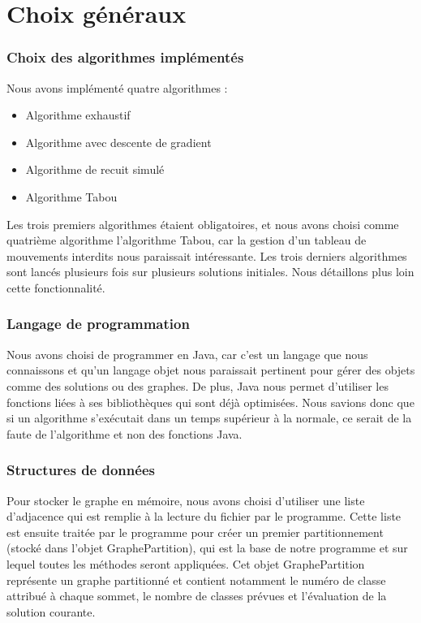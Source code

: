 \documentclass[12pt]{article}
\begin{document}
\newpage	
	
\part{Choix généraux}

\section{Choix des algorithmes implémentés}
Nous avons implémenté quatre algorithmes :
	\begin{itemize}
    \item Algorithme exhaustif
    \item Algorithme avec descente de gradient
	\item Algorithme de recuit simulé
	\item Algorithme Tabou
	\end{itemize}
Les trois premiers algorithmes étaient obligatoires, et nous avons choisi comme quatrième algorithme l’algorithme Tabou, car la gestion d’un tableau de mouvements interdits nous paraissait intéressante.
Les trois derniers algorithmes sont lancés plusieurs fois sur plusieurs solutions initiales. Nous détaillons plus loin cette fonctionnalité.

\section{Langage de programmation}
    Nous avons choisi de programmer en Java, car c’est un langage que nous connaissons et qu’un langage objet nous paraissait pertinent pour gérer des objets comme des solutions ou des graphes. De plus, Java nous permet d’utiliser les fonctions liées à ses bibliothèques qui sont déjà optimisées. Nous savions donc que si un algorithme s’exécutait dans un temps supérieur à la normale, ce serait de la faute de l’algorithme et non des fonctions Java.

\section{Structures de données}
Pour stocker le graphe en mémoire, nous avons choisi d’utiliser une liste d’adjacence qui est remplie à la lecture du fichier par le programme. Cette liste est ensuite traitée par le programme pour créer un premier partitionnement (stocké dans l’objet GraphePartition), qui est la base de notre programme et sur lequel toutes les méthodes seront appliquées. Cet objet GraphePartition représente un graphe partitionné et contient notamment le numéro de classe attribué à chaque sommet, le nombre de classes prévues et l’évaluation de la solution courante.
\end{document}
